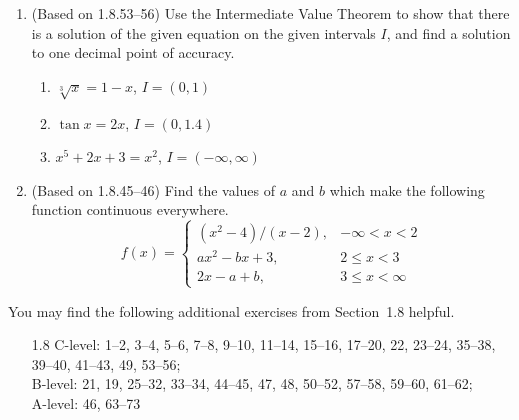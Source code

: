 \documentclass{article}
\begin{document}
\begin{enumerate}
\item (Based on 1.8.53--56) %
  Use the Intermediate Value Theorem to show that there is a solution
  of the given equation on the given intervals $I$, and find a
  solution to one decimal point of accuracy.
  \begin{multicols}{3}
  \begin{enumerate}
  \item $\sqrt[3]{x}=1-x$, $I=(0,1)$
  \item $\tan x = 2x$, $I=(0,1.4)$
  \item $x^5+2x+3=x^2$, $I=(-\infty,\infty)$
  \end{enumerate}
  \end{multicols}
\item (Based on 1.8.45--46) %
  Find the values of $a$ and $b$ which make the following function
  continuous everywhere.
  \begin{displaymath}
    f(x) = \begin{cases}
      (x^2-4)/(x-2), & \mbox{$-\infty < x < 2$} \\
      ax^2-bx+3,     & \mbox{$2       \le x < 3$} \\
      2x-a+b,        & \mbox{$3       \le x < \infty$}
    \end{cases}
  \end{displaymath}
\end{enumerate}

\noindent
You may find the following additional exercises from Section~1.8 helpful.
\begin{itemize}
\item[1.8] C-level: 1--2, 3--4, 5--6, 7--8, 9--10, 11--14, 15--16, 17--20,
    22, 23--24, 35--38, 39--40, 41--43, 49, 53--56;  \\
    B-level: 21, 19, 25--32, 33--34, 44--45, 47, 48, 50--52, 57--58, 59--60,
    61--62; \\
    A-level: 46, 63--73
\end{itemize}
\end{document}
